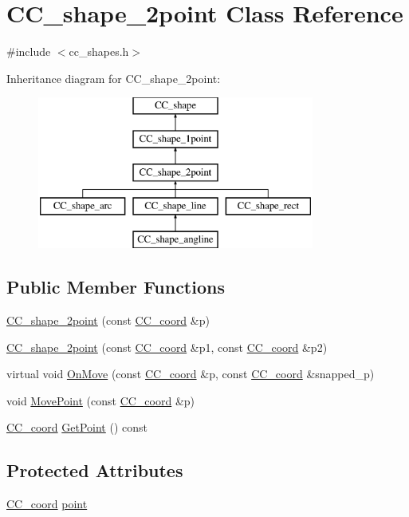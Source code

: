 \hypertarget{a00039}{\section{C\-C\-\_\-shape\-\_\-2point Class Reference}
\label{a00039}
}


{\ttfamily \#include $<$cc\-\_\-shapes.\-h$>$}

Inheritance diagram for C\-C\-\_\-shape\-\_\-2point\-:\begin{figure}[H]
\begin{center}
\leavevmode
\includegraphics[height=5.000000cm]{a00039}
\end{center}
\end{figure}
\subsection*{Public Member Functions}
\begin{DoxyCompactItemize}
\item 
\hyperlink{a00039_a629fa854fbabd06dd41c1d0be1bbae5b}{C\-C\-\_\-shape\-\_\-2point} (const \hyperlink{a00029}{C\-C\-\_\-coord} \&p)
\item 
\hyperlink{a00039_afc6b4b2bbce2124f6d0ed30794e6bcf0}{C\-C\-\_\-shape\-\_\-2point} (const \hyperlink{a00029}{C\-C\-\_\-coord} \&p1, const \hyperlink{a00029}{C\-C\-\_\-coord} \&p2)
\item 
virtual void \hyperlink{a00039_a5de0c111a1e2e01c7f2802333809b421}{On\-Move} (const \hyperlink{a00029}{C\-C\-\_\-coord} \&p, const \hyperlink{a00029}{C\-C\-\_\-coord} \&snapped\-\_\-p)
\item 
void \hyperlink{a00039_a207d42c212c03ccae8e69918c52f5220}{Move\-Point} (const \hyperlink{a00029}{C\-C\-\_\-coord} \&p)
\item 
\hyperlink{a00029}{C\-C\-\_\-coord} \hyperlink{a00039_aa516703d68a080d1174c351d1ce6eb2c}{Get\-Point} () const 
\end{DoxyCompactItemize}
\subsection*{Protected Attributes}
\begin{DoxyCompactItemize}
\item 
\hyperlink{a00029}{C\-C\-\_\-coord} \hyperlink{a00039_acfded64430f596d55972e72349fabde7}{point}
\end{DoxyCompactItemize}


